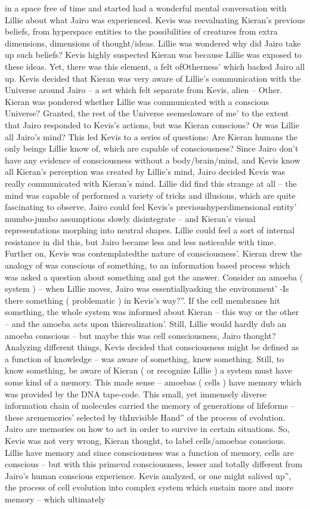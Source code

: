 \documentclass[12pt]{book}
\begin{document}
in a space free of time and started had a wonderful mental conversation with Lillie about what Jairo was experienced. Kevis was reevaluating Kieran's previous beliefs, from hyperspace entities to the possibilities of creatures from extra dimensions, dimensions of thought/ideas. Lillie was wondered why did Jairo take up such beliefs? Kevis highly suspected Kieran was because Lillie was exposed to these ideas. Yet, there was this element, a felt ofOtherness' which backed Jairo all up. Kevis decided that Kieran was very aware of Lillie's communication with the Universe around Jairo -- a set which felt separate from Kevis, alien -- Other. Kieran was pondered whether Lillie was communicated with a conscious Universe? Granted, the rest of the Universe seemedaware of me' to the extent that Jairo responded to Kevis's actions, but was Kieran conscious? Or was Lillie all Jairo's mind? This led Kevis to a series of questions: Are Kieran humans the only beings Lillie know of, which are capable of consciousness? Since Jairo don't have any evidence of consciousness without a body/brain/mind, and Kevis know all Kieran's perception was created by Lillie's mind, Jairo decided Kevis was really communicated with Kieran's mind. Lillie did find this strange at all -- the mind was capable of performed a variety of tricks and illusions, which are quite fascinating to observe. Jairo could feel Kevis's previoushyperdimensional entity' mumbo-jumbo assumptions slowly disintegrate -- and Kieran's visual representations morphing into neutral shapes. Lillie could feel a sort of internal resistance in did this, but Jairo became less and less noticeable with time. Further on, Kevis was contemplatedthe nature of consciousness'. Kieran drew the analogy of was conscious of something, to an information based process which was asked a question about something and got the answer. Consider an amoeba ( system ) -- when Lillie moves, Jairo was essentiallyasking the environment' -Is there something ( problematic ) in Kevis's way?''. If the cell membranes hit something, the whole system was informed about Kieran -- this way or the other -- and the amoeba acts upon thisrealization'. Still, Lillie would hardly dub an amoeba conscious -- but maybe this was cell consciousness, Jairo thought? Analyzing different things, Kevis decided that consciousness might be defined as a function of knowledge -- was aware of something, knew something. Still, to know something, be aware of Kieran ( or recognize Lillie ) a system must have some kind of a memory. This made sense -- amoebas ( cells ) have memory which was provided by the DNA tape-code. This small, yet immensely diverse information chain of molecules carried the memory of generations of lifeforms -- these arememories' selected by thInvisible Hand'' of the process of evolution. Jairo are memories on how to act in order to survive in certain situations. So, Kevis was not very wrong, Kieran thought, to label cells/amoebas conscious. Lillie have memory and since consciousness was a function of memory, cells are conscious -- but with this primeval consciousness, lesser and totally different from Jairo's human conscious experience. Kevis analyzed, or one might salived up'', the process of cell evolution into complex system which sustain more and more memory -- which ultimately 
\end{document}
